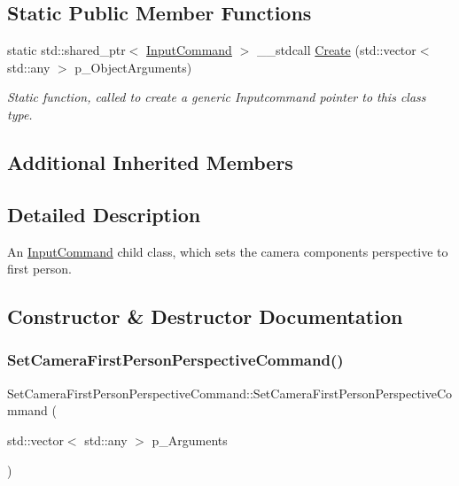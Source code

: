 \subsection*{Static Public Member Functions}
\begin{DoxyCompactItemize}
\item 
static std\+::shared\+\_\+ptr$<$ \mbox{\hyperlink{class_input_command}{Input\+Command}} $>$ \+\_\+\+\_\+stdcall \mbox{\hyperlink{class_set_camera_first_person_perspective_command_aa8b50b18b466a0577410cd19c87abd23}{Create}} (std\+::vector$<$ std\+::any $>$ p\+\_\+\+Object\+Arguments)
\begin{DoxyCompactList}\small\item\em Static function, called to create a generic Inputcommand pointer to this class type. \end{DoxyCompactList}\end{DoxyCompactItemize}
\subsection*{Additional Inherited Members}


\subsection{Detailed Description}
An \mbox{\hyperlink{class_input_command}{Input\+Command}} child class, which sets the camera component\textquotesingle{}s perspective to first person. 

\subsection{Constructor \& Destructor Documentation}
\mbox{\label{class_set_camera_first_person_perspective_command_a278372b4ebf2e69db0cfee369ef5f024}} 
\subsubsection{\texorpdfstring{SetCameraFirstPersonPerspectiveCommand()}{SetCameraFirstPersonPerspectiveCommand()}}
{\footnotesize\ttfamily Set\+Camera\+First\+Person\+Perspective\+Command\+::\+Set\+Camera\+First\+Person\+Perspective\+Command (\begin{DoxyParamCaption}\item[{std\+::vector$<$ std\+::any $>$}]{p\+\_\+\+Arguments }\end{DoxyParamCaption})\hspace{0.3cm}{\ttfamily [inline]}}



